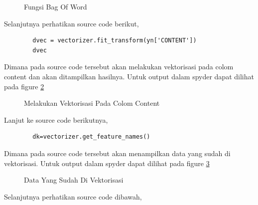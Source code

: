 \begin{enumerate}
	\begin{figure}[ht]
		\caption{Fungsi Bag Of Word}
		\label{YNC4-10}
	\end{figure}

Selanjutnya perhatikan source code berikut,

	\begin{verbatim}
		dvec = vectorizer.fit_transform(yn['CONTENT'])
		dvec
	\end{verbatim}	

Dimana pada source code tersebut akan melakukan vektorisasi pada colom content dan akan ditampilkan hasilnya. Untuk output dalam spyder dapat dilihat pada figure \ref{YNC4-11}

	\begin{figure}[ht]
		\caption{Melakukan Vektorisasi Pada Colom Content}
		\label{YNC4-11}
	\end{figure}

Lanjut ke source code berikutnya,

	\begin{verbatim}
		dk=vectorizer.get_feature_names()
	\end{verbatim}

Dimana pada source code tersebut akan menampilkan data yang sudah di vektorisasi. Untuk output dalam spyder dapat dilihat pada figure \ref{YNC4-12}

	\begin{figure}[ht]
		\caption{Data Yang Sudah Di Vektorisasi}
		\label{YNC4-12}
	\end{figure}

Selanjutnya perhatikan source code dibawah,


\end{enumerate}
